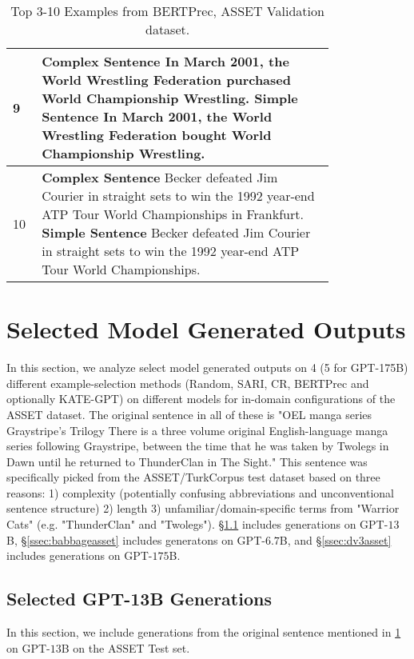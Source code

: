 \documentclass[11pt]{article}
\begin{document}
\begin{table*}[htbp]
\begin{tabular}{p{0.05\linewidth} p{0.75\linewidth}}
\midrule
9 & \textbf{Complex Sentence} In March 2001, the World Wrestling Federation purchased World Championship Wrestling. \newline \textbf{Simple Sentence} In March 2001, the World Wrestling Federation bought World Championship Wrestling.\\
\midrule
10 & \textbf{Complex Sentence} Becker defeated Jim Courier in straight sets to win the 1992 year-end ATP Tour World Championships in Frankfurt. \newline \textbf{Simple Sentence} Becker defeated Jim Courier in straight sets to win the 1992 year-end ATP Tour World Championships.\\
\bottomrule
\end{tabular}
\caption{Top 3-10 Examples from BERTPrec, ASSET Validation dataset.}
\label{tab:bertprecexamples}
\end{table*}

\section{Selected Model Generated Outputs}
\label{sec:modeloutputs}

In this section, we analyze select model generated outputs on 4 (5 for GPT-175B) different example-selection methods (Random, SARI, CR, BERTPrec and optionally KATE-GPT) on different models for in-domain configurations of the ASSET dataset. The original sentence in all of these is "OEL manga series Graystripe's Trilogy There is a three volume original English-language manga series following Graystripe, between the time that he was taken by Twolegs in Dawn until he returned to ThunderClan in The Sight." This sentence was specifically picked from the ASSET/TurkCorpus test dataset based on three reasons: 1) complexity (potentially confusing abbreviations and unconventional sentence structure) 2) length 3) unfamiliar/domain-specific terms from "Warrior Cats" (e.g. "ThunderClan" and "Twolegs"). \S\ref{ssec:curieasset} includes generations on GPT-$13$B, \S\ref{ssec:babbageasset} includes generatons on GPT-$6.7$B, and \S\ref{ssec:dv3asset} includes generations on GPT-$175$B.

\subsection{Selected GPT-13B Generations}
\label{ssec:curieasset}
In this section, we include generations from the original sentence mentioned in \ref{sec:modeloutputs} on GPT-$13$B on the ASSET Test set.
\end{document}
